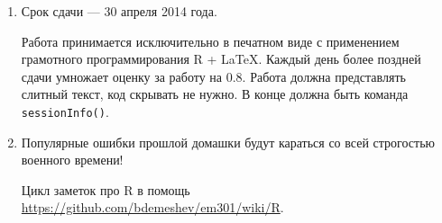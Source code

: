 \documentclass[a4paper]{article}
\begin{document}
\begin{enumerate}
\item Срок сдачи --- 30 апреля 2014 года. 

Работа принимается исключительно в печатном виде с применением грамотного программирования R + \LaTeX. Каждый день более поздней сдачи умножает оценку за работу на $0.8$.  Работа должна представлять слитный текст, код скрывать не нужно. В конце должна быть команда \verb|sessionInfo()|.

\item Популярные ошибки прошлой домашки будут караться со всей строгостью военного времени! 

Цикл заметок про R в помощь \url{https://github.com/bdemeshev/em301/wiki/R}.
 
\end{enumerate}
\end{document}
